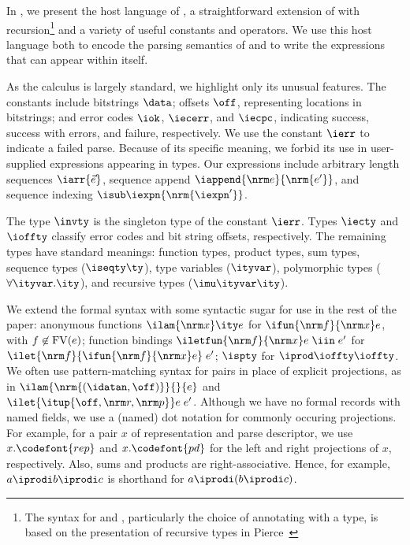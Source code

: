 In , we present the host language of
\ddc{}, a straightforward extension of \fomega{} with
recursion\footnote{The syntax for  and ,
  particularly the choice of annotating  with a type, is
  based on the presentation of recursive types in Pierce~\cite{pierce:tapl}} and a
variety of useful constants and operators. 
We use this host language both to encode the parsing semantics of
\ddc{} and to write the expressions that can appear within \ddc{}
itself.

As the calculus is largely standard, we highlight only its unusual
features. The constants include bitstrings $\data$; offsets $\off$,
representing locations in bitstrings; and error codes $\iok$,
$\iecerr$, and $\iecpc$, indicating success, success with errors, and
failure, respectively. We use the constant $\ierr$ to indicate a
failed parse.  Because of its specific meaning, we forbid its use in
user-supplied expressions appearing in \ddc{} types.
Our expressions include arbitrary length
sequences $\iarr{\vec e}$, sequence append $\iappend {\nrm e}
{\nrm {e'}}$, and sequence indexing $\isub \iexpn {\nrm {\iexpn'}}$.

The type $\invty$ is the singleton type of the constant $\ierr$.
Types $\iecty$ and $\ioffty$ classify error codes and bit string
offsets, respectively. The remaining types have standard meanings:
function types, product types, sum types, sequence types ($\iseqty
\ty$), type variables ($\ityvar$), polymorphic types ($\forall
\ityvar.\ity$), and recursive types ($\imu \ityvar \ity$).

We extend the formal syntax with some syntactic sugar for use in the
rest of the paper: anonymous functions $\ilam {\nrm x} \ity e$ for
$\ifun {\nrm f} {\nrm x} e$, with $f \not\in {\rm FV}(e)$; function
bindings $\iletfun {\nrm f} {\nrm x} e \; \iin \; e'$ for $\ilet {\nrm
  f} {\ifun {\nrm f} {\nrm x} e} \; e'$; $\ispty$ for $\iprod \ioffty
\ioffty$.  
We often use pattern-matching syntax for pairs in place of
explicit projections, as in $\ilam {\nrm{(\idatan,\off)}}{}{e}$ and $\ilet
{\itup{\off,\nrm r,\nrm p}} e\; e'$.  Although we have no formal records with
named fields, we use a (named) dot notation for commonly occuring projections.
For example, for a pair $x$ of representation and parse descriptor, we use
$x.\codefont{rep}$ and $x.\codefont{pd}$ for the left and right
projections of $x$, respectively.  Also, sums and products are
right-associative. Hence, for example, $a \iprodi b \iprodi c$ is
shorthand for $a \iprodi (b \iprodi c)$.

